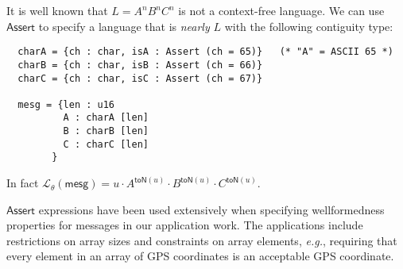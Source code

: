 \documentclass[a4paper,UKenglish,cleveref, autoref, thm-restate]{lipics-v2021}
\newcommand{\eg}{\textit{e.g.}}
\newcommand{\konst}[1]{\ensuremath{\mathsf{#1}}}
\newcommand{\LangTheta}[1]{\ensuremath{{\mathcal L}_{\theta}({#1})}}
\begin{document}
\begin{example}[$A^n B^n C^n$]

It is well known that $L = A^n B^n C^n$ is not a context-free
language. We can use \konst{Assert} to specify a language that is
\emph{nearly} $L$ with the following contiguity type:
%
{\small
\begin{verbatim}
  charA = {ch : char, isA : Assert (ch = 65)}   (* "A" = ASCII 65 *)
  charB = {ch : char, isB : Assert (ch = 66)}
  charC = {ch : char, isC : Assert (ch = 67)}

  mesg = {len : u16
          A : charA [len]
          B : charB [len]
          C : charC [len]
        }
\end{verbatim}
}
\noindent In fact $\LangTheta{\konst{mesg}} = u \cdot A^{\konst{toN}(u)} \cdot
B^{\konst{toN}(u)} \cdot C^{\konst{toN}(u)}$.
\end{example}



\noindent \konst{Assert} expressions have been used extensively when
specifying wellformedness properties for messages in our application
work. The applications include restrictions on array sizes and
constraints on array elements, \eg, requiring that every element in an
array of GPS coordinates is an acceptable GPS coordinate.
\end{document}
